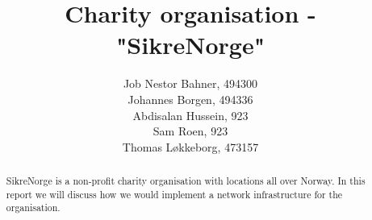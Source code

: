 


\newcommand{\notetous}[1] {
  \textbf{\textit{\textcolor{red}{#1}}}
}



\title{Charity organisation - "SikreNorge"}

\author{
  Job Nestor Bahner, 494300\\
  Johannes Borgen, 494336\\
  Abdisalan Hussein, 923\\
  Sam Roen, 923\\
  Thomas Løkkeborg, 473157
}



\maketitle

\begin{abstract}
SikreNorge is a non-profit charity organisation with locations all over Norway. In this report we will discuss how we would implement a network infrastructure for the organisation.
\end{abstract}


